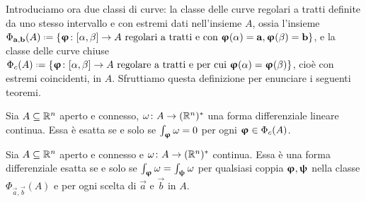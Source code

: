 Introduciamo ora due classi di curve: la classe delle curve regolari a tratti definite da uno stesso intervallo e con estremi dati nell'insieme $A$, ossia l'insieme $\Phi_{\vec a,\vec b}(A)\defeq\{\vphi\colon[\alpha,\beta]\to A\text{ regolari a tratti e con }\vphi(\alpha)=\vec a, \vphi(\beta)=\vec b\}$, e la classe delle curve chiuse $\Phi_c(A)\defeq\{\vphi\colon[\alpha,\beta]\to A\text{ regolare a tratti e per cui }\vphi(\alpha)=\vphi(\beta)\}$, cioè con estremi coincidenti, in $A$.
Sfruttiamo questa definizione per enunciare i seguenti teoremi.
\begin{teorema}
	Sia $A\subseteq\mathbb{R}^n$ aperto e connesso, $\omega\colon A\to(\mathbb{R}^n)^*$ una forma differenziale lineare continua.
	Essa è esatta se e solo se $\int_{\bm{\upvarphi}}\omega=0$ per ogni $\bm{\upvarphi}\in\Phi_c(A)$.
\end{teorema}
\begin{teorema}
	Sia $A\subseteq\mathbb{R}^n$ aperto e connesso e $\omega\colon A\to(\mathbb{R}^n)^*$ continua.
	Essa è una forma differenziale esatta se e solo se $\int_{\bm{\upvarphi}}\omega=\int_{\bm{\uppsi}}\omega$ per qualsiasi coppia $\bm{\upvarphi},\bm{\uppsi}$ nella classe $\Phi_{\vec a,\vec b}(A)$ e per ogni scelta di $\vec a$ e $\vec b$ in $A$.
\end{teorema}
